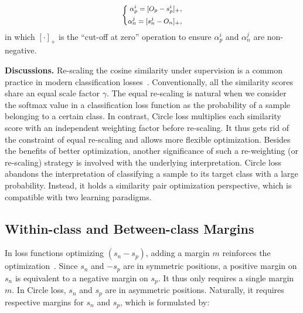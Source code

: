 \documentclass[10pt,twocolumn,letterpaper]{article}
\begin{document}
\begin{equation}\label{eq:scale}
 \footnotesize{
        \left\{
        \begin{aligned}
        \alpha_p^i=[O_p-s_p^i ]_+,\\
        \alpha_n^j=[s_n^j-O_n]_+,\\
        \end{aligned}
    \right.
    }
\end{equation}
in which $[\cdot]_+$ is the ``cut-off at zero'' operation to ensure $\alpha_p^i$ and $\alpha_n^j$ are non-negative.

\textbf{Discussions.} Re-scaling the cosine similarity under supervision is a common practice in modern classification losses~\cite{ranjan2017l2,wang2017normface,wang2018additive,Wang_2018_CVPR,Zhang2018HeatedUpSE,Zhang2019AdaCosAS}. Conventionally, all the similarity scores share an equal scale factor $\gamma$. The equal re-scaling is natural when we consider the softmax value in a classification loss function as the probability of a sample belonging to a certain class. In contrast, Circle loss multiplies each similarity score with an independent weighting factor before re-scaling. It thus gets rid of the constraint of equal re-scaling and allows more flexible optimization. Besides the benefits of better optimization, another significance of such a re-weighting (or re-scaling) strategy is involved with the underlying interpretation. Circle loss abandons the interpretation of classifying a sample to its target class with a large probability. Instead, it holds a similarity pair optimization perspective, which is compatible with two learning paradigms.

\subsection{Within-class and Between-class Margins}\label{sec:method_margin}

In loss functions optimizing $(s_n-s_p)$, adding a margin $m$ reinforces the optimization~\cite{liu2017sphereface,Liu2016LargeMarginSL,wang2018additive,Wang_2018_CVPR}. Since $s_n$ and $-s_p$ are in symmetric positions, a positive margin on $s_n$ is equivalent to  a negative margin on $s_p$. It thus only requires a single margin $m$. In Circle loss, $s_n$ and $s_p$ are in asymmetric positions. Naturally, it requires respective margins for $s_n$ and $s_p$, which is formulated by:
\end{document}
